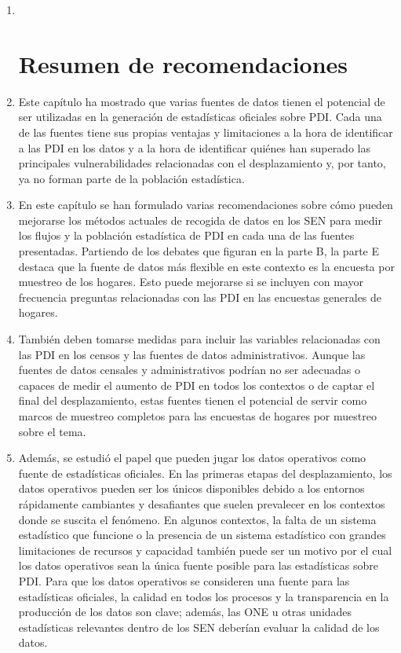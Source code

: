 \documentclass[
]{book}
\begin{document}
\begin{enumerate}
\def\labelenumi{\arabic{enumi}.}
\item ~
  \hypertarget{resumen-de-recomendaciones-3}{%
  \section{Resumen de recomendaciones}\label{resumen-de-recomendaciones-3}}
\item
  Este capítulo ha mostrado que varias fuentes de datos tienen el potencial de ser utilizadas en la generación de estadísticas oficiales sobre PDI. Cada una de las fuentes tiene sus propias ventajas y limitaciones a la hora de identificar a las PDI en los datos y a la hora de identificar quiénes han superado las principales vulnerabilidades relacionadas con el desplazamiento y, por tanto, ya no forman parte de la población estadística.
\item
  En este capítulo se han formulado varias recomendaciones sobre cómo pueden mejorarse los métodos actuales de recogida de datos en los SEN para medir los flujos y la población estadística de PDI en cada una de las fuentes presentadas. Partiendo de los debates que figuran en la parte B, la parte E destaca que la fuente de datos más flexible en este contexto es la encuesta por muestreo de los hogares. Esto puede mejorarse si se incluyen con mayor frecuencia preguntas relacionadas con las PDI en las encuestas generales de hogares.
\item
  También deben tomarse medidas para incluir las variables relacionadas con las PDI en los censos y las fuentes de datos administrativos. Aunque las fuentes de datos censales y administrativos podrían no ser adecuadas o capaces de medir el aumento de PDI en todos los contextos o de captar el final del desplazamiento, estas fuentes tienen el potencial de servir como marcos de muestreo completos para las encuestas de hogares por muestreo sobre el tema.
\item
  Además, se estudió el papel que pueden jugar los datos operativos como fuente de estadísticas oficiales. En las primeras etapas del desplazamiento, los datos operativos pueden ser los únicos disponibles debido a los entornos rápidamente cambiantes y desafiantes que suelen prevalecer en los contextos donde se suscita el fenómeno. En algunos contextos, la falta de un sistema estadístico que funcione o la presencia de un sistema estadístico con grandes limitaciones de recursos y capacidad también puede ser un motivo por el cual los datos operativos sean la única fuente posible para las estadísticas sobre PDI. Para que los datos operativos se consideren una fuente para las estadísticas oficiales, la calidad en todos los procesos y la transparencia en la producción de los datos son clave; además, las ONE u otras unidades estadísticas relevantes dentro de los SEN deberían evaluar la calidad de los datos.

\end{enumerate}
\end{document}
